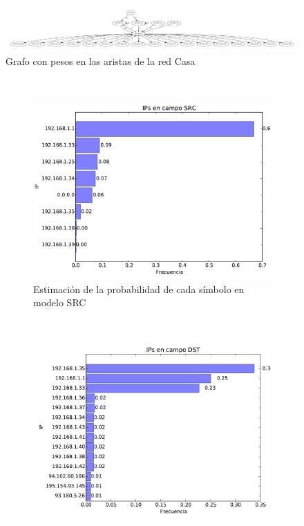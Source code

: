~
\FloatBarrier

\begin{figure}[!h]
	\begin{center}
		  \includegraphics[scale=0.23]{resultados/casa/conectividad.pdf}
		  \caption{Grafo con pesos en las aristas de la red Casa}
		  \label{fig:contra1}
	\end{center}
\end{figure}

\FloatBarrier

~

\begin{figure}[H]
	\center
	\begin{subfigure}{0.4\textwidth}
		\includegraphics[width=1.0\textwidth]{resultados/casa/ipsSrc_1_6805902069.pdf}
		\caption{Estimaci\'on de la probabilidad de cada s\'imbolo en modelo SRC}
	\end{subfigure}
	~
	\begin{subfigure}{0.4\textwidth}
		\includegraphics[width=1.0\textwidth]{resultados/casa/ipsDst_2_67355481854.pdf}

\end{subfigure}
\end{figure}
